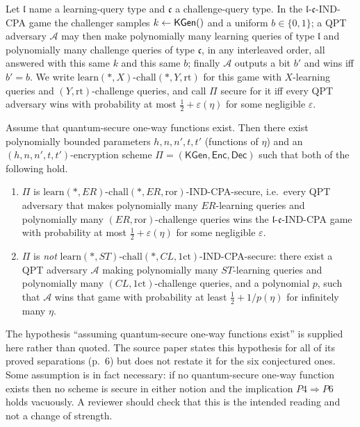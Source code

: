 \documentclass{aicr-conjecture}
\newcommand{\KGen}{\mathsf{KGen}}
\newcommand{\Enc}{\mathsf{Enc}}
\newcommand{\Dec}{\mathsf{Dec}}
\newcommand{\ror}{\mathrm{ror}}
\newcommand{\onect}{1\mathrm{ct}}
\newcommand{\learn}{\mathrm{learn}}
\newcommand{\chall}{\mathrm{chall}}
\newcommand{\NERror}{\ensuremath{\learn(*,ER)}-\ensuremath{\chall(*,ER,\ror)}}
\newcommand{\NBZ}{\ensuremath{\learn(*,ST)}-\ensuremath{\chall(*,CL,\onect)}}
\begin{document}
\begin{definition}\label{def:indcpa}
Let $\mathfrak{l}$ name a learning-query type and $\mathfrak{c}$ a
challenge-query type. In the $\mathfrak{l}$-$\mathfrak{c}$-IND-CPA game
the challenger samples $k\sample\KGen()$ and a uniform $b\in\{0,1\}$; a
QPT adversary $\mathcal{A}$ may then make polynomially many learning
queries of type $\mathfrak{l}$ and polynomially many challenge queries
of type $\mathfrak{c}$, in any interleaved order, all answered with this
same $k$ and this same $b$; finally $\mathcal{A}$ outputs a bit $b'$ and
wins iff $b'=b$. We write $\learn(*,X)$-$\chall(*,Y,\mathrm{rt})$ for
this game with $X$-learning queries and $(Y,\mathrm{rt})$-challenge
queries, and call $\Pi$ secure for it iff every QPT adversary wins with
probability at most $\tfrac12+\varepsilon(\eta)$ for some negligible
$\varepsilon$.
\end{definition}

\begin{conjecture}\label{conj:main}
Assume that quantum-secure one-way functions exist. Then there exist
polynomially bounded parameters $h,n,n',t,t'$ (functions of $\eta$) and
an $(h,n,n',t,t')$-encryption scheme $\Pi=(\KGen,\Enc,\Dec)$ such that
both of the following hold.
\begin{enumerate}
  \item $\Pi$ is \NERror-IND-CPA-secure, i.e.\ every QPT adversary that
    makes polynomially many $ER$-learning queries and polynomially many
    $(ER,\ror)$-challenge queries wins the
    $\mathfrak{l}$-$\mathfrak{c}$-IND-CPA game with probability at most
    $\tfrac12+\varepsilon(\eta)$ for some negligible $\varepsilon$.
  \item $\Pi$ is \emph{not} \NBZ-IND-CPA-secure: there exist a QPT
    adversary $\mathcal{A}$ making polynomially many $ST$-learning
    queries and polynomially many $(CL,\onect)$-challenge queries, and a
    polynomial $p$, such that $\mathcal{A}$ wins that game with
    probability at least $\tfrac12+1/p(\eta)$ for infinitely many
    $\eta$.
\end{enumerate}
\end{conjecture}

\begin{remark}\label{rem:owf}
The hypothesis ``assuming quantum-secure one-way functions exist'' is
supplied here rather than quoted. The source paper states this
hypothesis for all of its proved separations (p.~6) but does not restate
it for the six conjectured ones. Some assumption is in fact necessary:
if no quantum-secure one-way function exists then no scheme is secure in
either notion and the implication $P4\Rightarrow P6$ holds vacuously. A
reviewer should check that this is the intended reading and not a change
of strength.
\end{remark}
\end{document}
